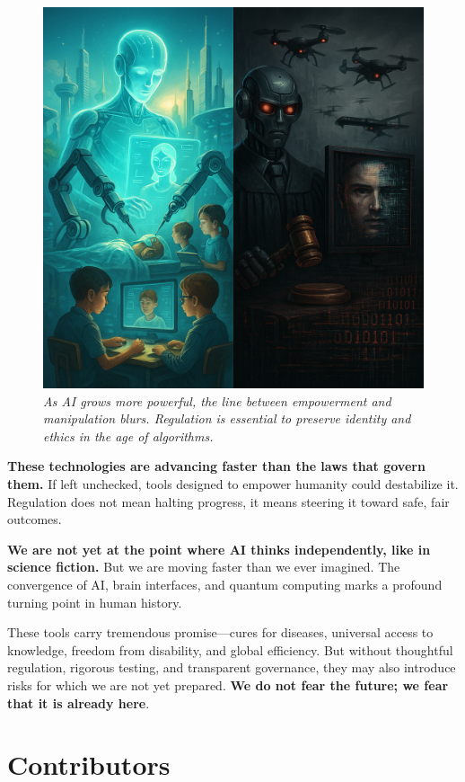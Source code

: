 \documentclass[a4paper,10pt,twocolumn]{memoir}
\begin{document}
\begin{figure}[h!]
  \centering
  \includegraphics[width=0.9\linewidth]{aivlona.png}
  \caption*{\textit{As AI grows more powerful, the line between empowerment and manipulation blurs. Regulation is essential to preserve identity and ethics in the age of algorithms.}}
\end{figure}

\textbf{These technologies are advancing faster than the laws that govern them.} If left unchecked, tools designed to empower humanity could destabilize it. Regulation does not mean halting progress, it means steering it toward safe, fair outcomes.

\textbf{We are not yet at the point where AI thinks independently, like in science fiction.} But we are moving faster than we ever imagined. The convergence of AI, brain interfaces, and quantum computing marks a profound turning point in human history.

These tools carry tremendous promise—cures for diseases, universal access to knowledge, freedom from disability, and global efficiency. But without thoughtful regulation, rigorous testing, and transparent governance, they may also introduce risks for which we are not yet prepared. \textbf{We do not fear the future; we fear that it is already here}.
\clearpage


\section*{Contributors}
\vspace*{0.2cm}
\end{document}
